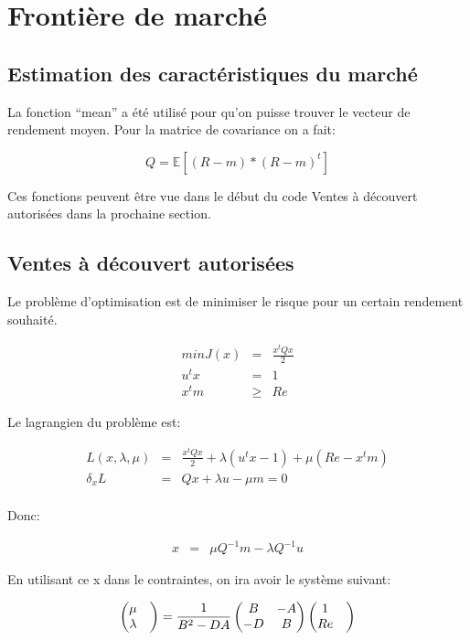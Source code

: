 \documentclass[a4paper,11pt]{article}
\begin{document}
\titleTMB 
\newpage
\tableofcontents
\listoffigures
\newpage

\section{Frontière de marché}

\subsection{Estimation des caractéristiques du marché}

La  fonction ``mean''  a été  utilisé pour  qu'on puisse  trouver le  vecteur de
rendement moyen. Pour la matrice de covariance on a fait:

\begin{equation*}
Q = \mathbb{E}[(R-m)*(R-m)^{t}]
\end{equation*}

Ces  fonctions  peuvent être  vue  dans  le début  du  code  Ventes à  découvert
autorisées dans la prochaine section.

\subsection{Ventes à découvert autorisées}

Le problème d'optimisation est de  minimiser le risque pour un certain rendement
souhaité.

\begin{eqnarray*}
min J(x)&=& \frac{x^tQx}{2}\\
u^tx&=&1\\
x^tm&\geq&Re
\end{eqnarray*}

Le lagrangien du problème est:

\begin{eqnarray*}
L(x,\lambda,\mu)&=& \frac{x^tQx}{2}+ \lambda (u^tx-1)+ \mu(Re-x^tm)\\
\delta_xL&=&Qx + \lambda u - \mu m = 0\\
\end{eqnarray*}

Donc:


\begin{eqnarray*}
x &=& \mu Q^{-1}m - \lambda Q^{-1} u
\end{eqnarray*}

En utilisant ce x dans le contraintes, on ira avoir le système suivant:

\begin{eqnarray*}
\begin{pmatrix}
  \mu &  \\
  \lambda
 \end{pmatrix} 
={1 \over B^2-DA}\begin{pmatrix}
  B & -A\\
  -D & B
 \end{pmatrix} 
\begin{pmatrix}
  1 &  \\
  Re
 \end{pmatrix} 
\end{eqnarray*}
 
\end{document}

